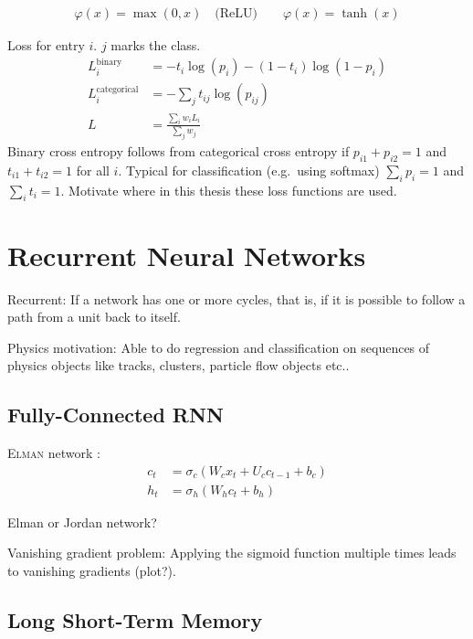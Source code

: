 \begin{align*}
  \varphi(x) = \max(0, x) \quad \text{(ReLU)} \qquad \varphi(x) = \tanh(x)
\end{align*}

Loss for entry $i$. $j$ marks the class.
\begin{align*}
  L_i^\mathrm{binary} &= -t_i \log(p_i) - (1 - t_i) \log(1 - p_i) \\
  L_i^\mathrm{categorical} &= - \sum_j t_{ij} \log(p_{ij}) \\
  L &= \frac{\sum_i w_i L_i}{\sum_j w_j}
\end{align*}
Binary cross entropy follows from categorical cross entropy if
$p_{i1} + p_{i2} = 1$ and $t_{i1} + t_{i2} = 1$ for all $i$. Typical for
classification (e.g.\ using softmax) $\sum_i p_i = 1$ and $\sum_i t_i = 1$.
Motivate where in this thesis these loss functions are used.

\section{Recurrent Neural Networks}
\label{sec:rnn}

Recurrent: If a network has one or more cycles, that is, if it is possible to
follow a path from a unit back to itself.

Physics motivation: Able to do regression and classification on sequences of
physics objects like tracks, clusters, particle flow objects etc..

\subsection{Fully-Connected RNN}
\label{sec:fully_connected_rnn}

\textsc{Elman} network \cite{elman}:
\begin{align*}
  c_t &= \sigma_c(W_c x_t + U_c c_{t-1} + b_c) \\
  h_t &= \sigma_h(W_h c_t + b_h)
\end{align*}

Elman or Jordan network?

Vanishing gradient problem: Applying the sigmoid function multiple times leads
to vanishing gradients (plot?).

\subsection{Long Short-Term Memory}
\label{sec:lstm}

